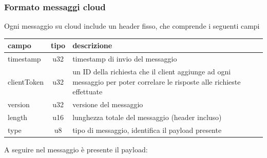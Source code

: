 \documentclass[12pt,a4paper,twoside,titlepage]{book}
\begin{document}
\subsubsection{Formato messaggi cloud}

Ogni messaggio su cloud include un header fisso, che comprende i seguenti campi

\begin{center}
\begin{longtable}{| p{5cm} | c | p{8cm} |}
    \hline
    \textbf{campo} & \textbf{tipo} & \textbf{descrizione} \\ \hline
    timestamp & u32 & timestamp di invio del messaggio \\ \hline
    clientToken & u32 & un ID della richiesta che il client aggiunge ad ogni messaggio
        per poter correlare le risposte alle richieste effettuate \\ \hline
    version & u32 & versione del messaggio \\\hline
    length & u16 & lunghezza totale del messaggio (header incluso) \\ \hline
    type & u8 & tipo di messaggio, identifica il payload presente \\ \hline
\end{longtable}
\end{center}

A seguire nel messaggio è presente il payload:
\end{document}
